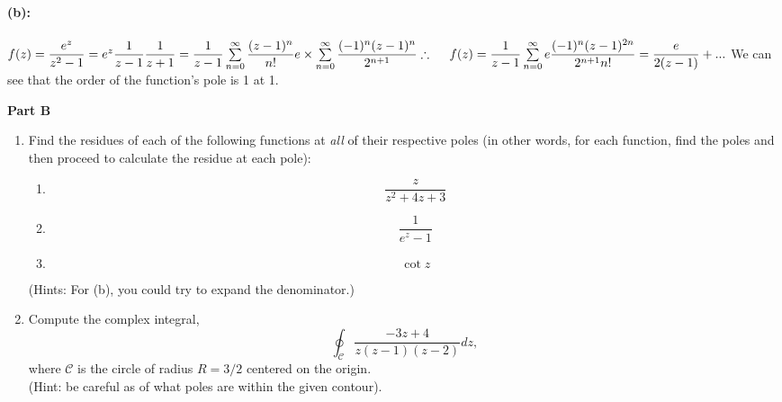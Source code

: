 \documentclass[fleqn]{article}
\begin{document}
\begin{enumerate}
{      \textbf{(b):}
      \\
      \\
      $
        f(z)=\dfrac{e^z}{z^2-1}=e^z \dfrac{1}{z-1} \dfrac{1}{z+1}
        \\
        \\
        =\dfrac{1}{z-1} \sum\limits_{n=0}^{\infty} \dfrac{(z-1)^n}{n!} e \times \sum\limits_{n=0}^{\infty} \dfrac{(-1)^n (z-1)^n}{2^{n+1}}
        \\
        \\
        \\
        \therefore ~~~~ f(z)=\dfrac{1}{z-1} \sum\limits_{n=0}^{\infty} e \dfrac{(-1)^n (z-1)^{2n}}{2^{n+1} n!}=\dfrac{e}{2(z-1)}+...
      $
      We can see that the order of the function's pole is 1 at 1.
    }

  \end{enumerate}

  \pagebreak

  \textbf{Part B}
  \begin{enumerate}

    \item Find the residues of each of the following functions at \emph{all} of their respective poles (in other words, for each function, find the poles and then proceed to calculate the residue at each pole):
    \begin{enumerate}
      \item $$\frac{z}{z^2 + 4z + 3}$$
      
      \item $$\frac{1}{e^z - 1}$$
      
      \item $$\cot z$$
    \end{enumerate}
    (Hints:  For (b), you could try to expand the denominator.) 
    
    
    \item Compute the complex integral,
    $$ \oint_{\mathcal C} \frac{-3z + 4}{z(z-1)(z-2)} dz ,$$
    where ${\mathcal C}$ is the circle of radius $R=3/2$ centered on the origin. \\
    (Hint:  be careful as of what poles are within the given contour). 
    
  \end{enumerate}
\end{document}
